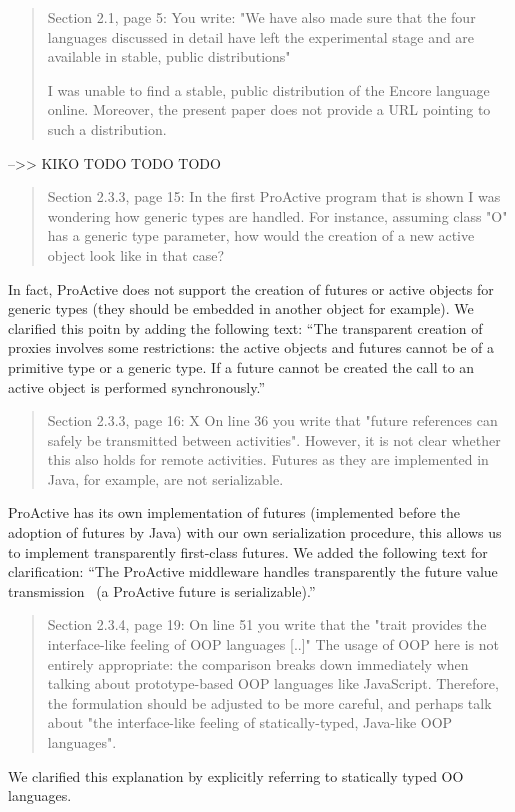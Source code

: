 \documentclass{article}
\begin{document}
\begin{quote}
	Section 2.1, page 5:
You write: "We have also made sure that the four languages discussed in detail have left 
the experimental stage and are available in stable, public distributions"

I was unable to find a stable, public distribution of the Encore language online. 
Moreover, the present paper does not provide a URL pointing to such a distribution.
\end{quote}
-->> KIKO
TODO TODO TODO


\begin{quote}
	Section 2.3.3, page 15:
In the first ProActive program that is shown I was wondering how generic types are 
handled. For instance, assuming class "O" has a generic type parameter, how would the 
creation of a new active object look like in that case?
\end{quote}
In fact, ProActive does not support the creation of futures or active objects for generic 
types (they should be embedded in another object for example). We clarified this poitn by 
adding the following text: ``The transparent creation of proxies 
involves some restrictions: the  active 
objects and futures cannot be of a primitive type or a generic type. If a future cannot 
be created the call to an active object is performed synchronously.''

\begin{quote}
	Section 2.3.3, page 16:
X On line 36 you write that "future references can safely be transmitted between 
activities". However, it is not clear whether this also holds for remote activities. 
Futures as they are implemented in Java, for example, are not serializable.
\end{quote}
ProActive has its own implementation of futures (implemented before the adoption of 
futures by Java) with our own serialization procedure, this allows us to implement 
transparently first-class futures. We added the following text for clarification:
``The ProActive middleware handles transparently the 
future value transmission~\cite{HKRZ:Coregrid:2010} (a ProActive future is 
serializable).''

\begin{quote}
	Section 2.3.4, page 19:
On line 51 you write that the "trait provides the interface-like feeling of OOP languages 
[..]" The usage of OOP here is not entirely appropriate: the comparison breaks down 
immediately when talking about prototype-based OOP languages like JavaScript. Therefore, 
the formulation should be adjusted to be more careful, and perhaps talk about "the 
interface-like feeling of statically-typed, Java-like OOP languages".
\end{quote}
We clarified this explanation by explicitly referring to statically typed OO languages.
\end{document}
